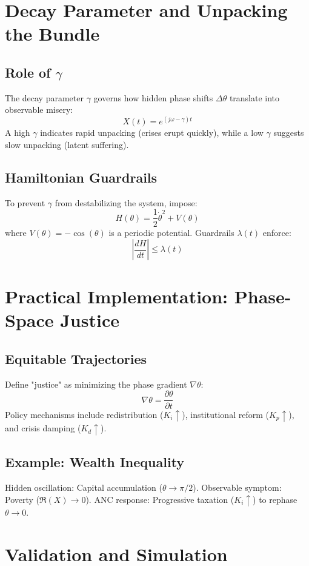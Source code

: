 \documentclass{article}
\theoremstyle{definition}
\begin{document}
\section{Decay Parameter and Unpacking the Bundle}

\subsection{Role of \( \gamma \)}
The decay parameter \( \gamma \) governs how hidden phase shifts \( \Delta\theta \) translate into observable misery:
\[
X(t) = e^{(j\omega - \gamma)t}
\]
A high \( \gamma \) indicates rapid unpacking (crises erupt quickly), while a low \( \gamma \) suggests slow unpacking (latent suffering).

\subsection{Hamiltonian Guardrails}
To prevent \( \gamma \) from destabilizing the system, impose:
\[
H(\theta) = \frac{1}{2} \dot{\theta}^2 + V(\theta)
\]
where \( V(\theta) = -\cos(\theta) \) is a periodic potential. Guardrails \( \lambda(t) \) enforce:
\[
\left| \frac{dH}{dt} \right| \leq \lambda(t)
\]

\section{Practical Implementation: Phase-Space Justice}

\subsection{Equitable Trajectories}
Define "justice" as minimizing the phase gradient \( \nabla\theta \):
\[
\nabla\theta = \frac{\partial \theta}{\partial t}
\]
Policy mechanisms include redistribution (\( K_i \uparrow \)), institutional reform (\( K_p \uparrow \)), and crisis damping (\( K_d \uparrow \)).

\subsection{Example: Wealth Inequality}
Hidden oscillation: Capital accumulation (\( \theta \rightarrow \pi/2 \)). Observable symptom: Poverty (\( \Re(X) \rightarrow 0 \)). ANC response: Progressive taxation (\( K_i \uparrow \)) to rephase \( \theta \rightarrow 0 \).

\section{Validation and Simulation}
\end{document}
